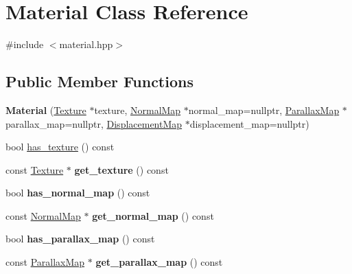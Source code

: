 \hypertarget{class_material}{}\section{Material Class Reference}
\label{class_material}


{\ttfamily \#include $<$material.\+hpp$>$}

\subsection*{Public Member Functions}
\begin{DoxyCompactItemize}
\item 
\mbox{\label{class_material_a5f13270a309ddc1805fb8debe6a9ca55}} 
{\bfseries Material} (\mbox{\hyperlink{class_texture}{Texture}} $\ast$texture, \mbox{\hyperlink{class_normal_map}{Normal\+Map}} $\ast$normal\+\_\+map=nullptr, \mbox{\hyperlink{class_parallax_map}{Parallax\+Map}} $\ast$parallax\+\_\+map=nullptr, \mbox{\hyperlink{class_displacement_map}{Displacement\+Map}} $\ast$displacement\+\_\+map=nullptr)
\item 
bool \mbox{\hyperlink{class_material_a2cbd77887660ea994ff3212d5630d575}{has\+\_\+texture}} () const
\item 
\mbox{\label{class_material_a75d9771927c46c10299088d960da291a}} 
const \mbox{\hyperlink{class_texture}{Texture}} $\ast$ {\bfseries get\+\_\+texture} () const
\item 
\mbox{\label{class_material_a8a1b4f058fec07fff599f09fc666792c}} 
bool {\bfseries has\+\_\+normal\+\_\+map} () const
\item 
\mbox{\label{class_material_a202edfb1421c3731262e0020d01afa01}} 
const \mbox{\hyperlink{class_normal_map}{Normal\+Map}} $\ast$ {\bfseries get\+\_\+normal\+\_\+map} () const
\item 
\mbox{\label{class_material_ae16d88f71df7097c161fe0ced7d26bf3}} 
bool {\bfseries has\+\_\+parallax\+\_\+map} () const
\item 
\mbox{\label{class_material_a757210ff3a350f629999464e8fd518b6}} 
const \mbox{\hyperlink{class_parallax_map}{Parallax\+Map}} $\ast$ {\bfseries get\+\_\+parallax\+\_\+map} () const

\end{DoxyCompactItemize}
